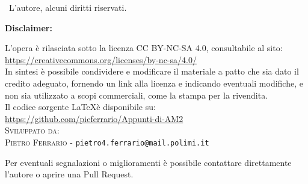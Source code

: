 \textcopyright \ L'autore, alcuni diritti riservati.\\
\vspace*{6pt}

\textbf{Disclaimer:} 
\vspace*{12pt}

L'opera è rilasciata sotto la licenza CC BY-NC-SA 4.0, consultabile al sito:\\
\url{https://creativecommons.org/licenses/by-nc-sa/4.0/}\\

In sintesi è possibile condividere e modificare il materiale a patto che sia dato il credito adeguato,  fornendo un link alla licenza e indicando eventuali modifiche, e non sia utilizzato a scopi commerciali, come la stampa per la rivendita.\\
Il codice sorgente \LaTeX è disponibile su:\\
\url{https://github.com/pieferrario/Appunti-di-AM2}\\

\noindent\textsc{Sviluppato da:}\\
\textsc{Pietro Ferrario} - \texttt{pietro4.ferrario@mail.polimi.it}

Per eventuali segnalazioni o miglioramenti è possibile contattare direttamente l'autore o aprire una Pull Request.